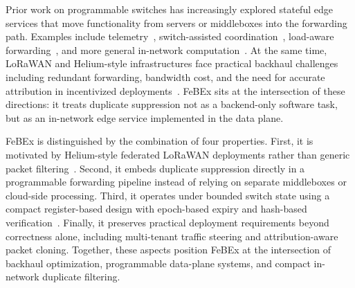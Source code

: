 Prior work on programmable switches has increasingly explored stateful edge services that move functionality from servers or middleboxes into the forwarding path. Examples include telemetry~\cite{int}, switch-assisted coordination~\cite{silkroad}, load-aware forwarding~\cite{conga}, and more general in-network computation~\cite{chen_p4com21}. At the same time, LoRaWAN and Helium-style infrastructures face practical backhaul challenges including redundant forwarding, bandwidth cost, and the need for accurate attribution in incentivized deployments~\cite{helium_imc21}. FeBEx sits at the intersection of these directions: it treats duplicate suppression not as a backend-only software task, but as an in-network edge service implemented in the data plane.

FeBEx is distinguished by the combination of four properties. First, it is motivated by Helium-style federated LoRaWAN deployments rather than generic packet filtering~\cite{helium_imc21}. Second, it embeds duplicate suppression directly in a programmable forwarding pipeline instead of relying on separate middleboxes or cloud-side processing. Third, it operates under bounded switch state using a compact register-based design with epoch-based expiry and hash-based verification~\cite{hashtables,bloomfilters}. Finally, it preserves practical deployment requirements beyond correctness alone, including multi-tenant traffic steering and attribution-aware packet cloning. Together, these aspects position FeBEx at the intersection of backhaul optimization, programmable data-plane systems, and compact in-network duplicate filtering.





